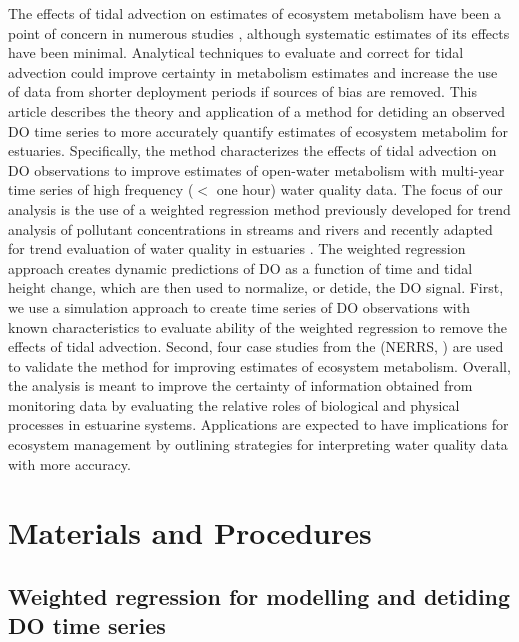 \documentclass[letterpaper,12pt,oneside]{article}\usepackage[]{graphicx}\usepackage[]{color}
\begin{document}
The effects of tidal advection on estimates of ecosystem metabolism have been a point of concern in numerous studies \citep{Monbet92,Ziegler98,Caffrey03,Collins13,Howarth14}, although systematic estimates of its effects have been minimal.  Analytical techniques to evaluate and correct for tidal advection could improve certainty in metabolism estimates and increase the use of data from shorter deployment periods if sources of bias are removed.  This article describes the theory and application of a method for detiding an observed \ac{DO} time series to more accurately quantify estimates of ecosystem metabolim for estuaries.  Specifically, the method characterizes the effects of tidal advection on \ac{DO} observations to improve estimates of open-water metabolism with multi-year time series of high frequency ($<$ one hour) water quality data.  The focus of our analysis is the use of a weighted regression method previously developed for trend analysis of pollutant concentrations in streams and rivers \citep{Hirsch10} and recently adapted for trend evaluation of water quality in estuaries .  The weighted regression approach creates dynamic predictions of \ac{DO} as a function of time and tidal height change, which are then used to normalize, or detide, the \ac{DO} signal.  First, we use a simulation approach to create time series of \ac{DO} observations with known characteristics to evaluate ability of the weighted regression to remove the effects of tidal advection.  Second, four case studies from the  (\acs{NERRS}, \citealt{Wenner04}) are used to validate the method for improving estimates of ecosystem metabolism.  Overall, the analysis is meant to improve the certainty of information obtained from monitoring data by evaluating the relative roles of biological and physical processes in estuarine systems.  Applications are expected to have implications for ecosystem management by outlining strategies for interpreting water quality data with more accuracy.

\section{Materials and Procedures}

\subsection{Weighted regression for modelling and detiding \ac{DO} time series}
\end{document}
